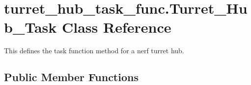 \hypertarget{classturret__hub__task__func_1_1Turret__Hub__Task}{}\section{turret\+\_\+hub\+\_\+task\+\_\+func.\+Turret\+\_\+\+Hub\+\_\+\+Task Class Reference}
\label{classturret__hub__task__func_1_1Turret__Hub__Task}


This defines the task function method for a nerf turret hub.  


\subsection*{Public Member Functions}
